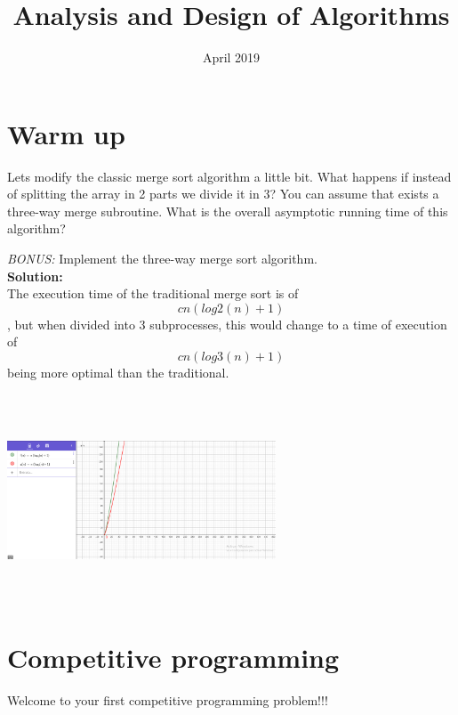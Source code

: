 \documentclass[12pt]{article}
\title{Analysis and Design of Algorithms}
\author{}
\date{April 2019}
\begin{document}
\maketitle

\section{Warm up}

Lets modify the classic merge sort algorithm a little bit. What happens if instead of splitting the array in 2 parts we divide it in 3? You can assume that exists a three-way merge subroutine. What is the overall asymptotic running time of this algorithm?

\emph{BONUS:} Implement the three-way merge sort algorithm.\\

\textbf{Solution:}\\
The execution time of the traditional merge sort is of\begin{equation} cn (log2 (n) +1) \end{equation} , but when divided into 3 subprocesses, this would change to a time of execution of \begin{equation} cn (log3 (n) +1) \end{equation} being more optimal than the traditional.\\\\
\includegraphics[width=8cm, height=6cm]{Captura}
\centering
\section{Competitive programming}

Welcome to your first competitive programming problem!!! 
\end{document}
